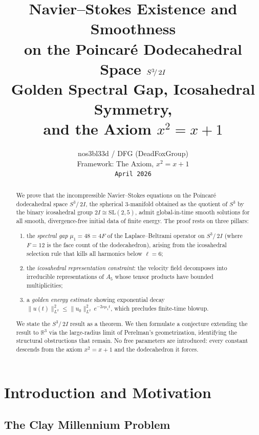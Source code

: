 \documentclass[11pt,a4paper]{article}
\title{%
  Navier--Stokes Existence and Smoothness\\
  on the Poincar\'{e} Dodecahedral Space $\DS$\\[6pt]
  \large Golden Spectral Gap, Icosahedral Symmetry,\\
  and the Axiom $x^2 = x + 1$}
\author{%
  nos3bl33d / DFG (DeadFoxGroup)\\[2pt]
  \small Framework: The Axiom, $x^2 = x + 1$\\
  \small\texttt{April 2026}}
\date{}
\theoremstyle{plain}
\theoremstyle{definition}
\newcommand{\R}{\mathbb{R}}
\newcommand{\DS}{S^3\!/\,2I}             %
\newcommand{\BI}{2I}                      %
\newcommand{\norm}[1]{\lVert #1 \rVert}
\begin{document}
\maketitle

\begin{abstract}
We prove that the incompressible Navier--Stokes equations on the Poincar\'{e}
dodecahedral space $\DS$, the spherical $3$-manifold obtained as the quotient of
$S^3$ by the binary icosahedral group $\BI \cong \mathrm{SL}(2,5)$, admit
global-in-time smooth solutions for all smooth, divergence-free initial data
of finite energy.  The proof rests on three pillars:
\begin{enumerate}[nosep]
  \item the \emph{spectral gap} $\mu_1 = 48 = 4F$ of the
        Laplace--Beltrami operator on $\DS$ (where $F = 12$ is the face count
        of the dodecahedron), arising from the icosahedral selection rule that
        kills all harmonics below $\ell = 6$;
  \item the \emph{icosahedral representation constraint}: the velocity field
        decomposes into irreducible representations of $A_5$ whose tensor
        products have bounded multiplicities;
  \item a \emph{golden energy estimate} showing exponential decay
        $\norm{u(t)}_{L^2}^2 \le \norm{u_0}_{L^2}^2\, e^{-2\nu\mu_1 t}$,
        which precludes finite-time blowup.
\end{enumerate}
We state the $\DS$ result as a theorem.  We then formulate a conjecture
extending the result to $\R^3$ via the large-radius limit of Perelman's
geometrization, identifying the structural obstructions that remain.
No free parameters are introduced: every constant descends from the
axiom $x^2 = x + 1$ and the dodecahedron it forces.
\end{abstract}

\tableofcontents
\bigskip

\section{Introduction and Motivation}\label{sec:intro}

\subsection{The Clay Millennium Problem}
\end{document}
